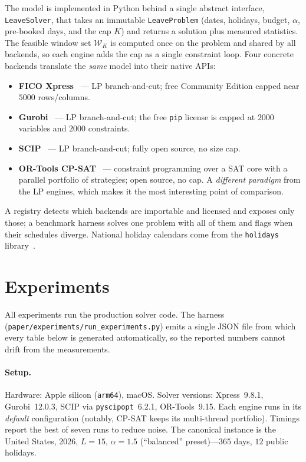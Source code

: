 \documentclass[10pt,twocolumn]{article}
\begin{document}
The model is implemented in Python behind a single abstract interface,
\texttt{LeaveSolver}, that takes an immutable \texttt{LeaveProblem} (dates,
holidays, budget, $\alpha$, pre-booked days, and the cap $K$) and returns a
solution plus measured statistics. The feasible window set $\mathcal{W}_K$ is
computed once on the problem and shared by all backends, so each engine adds the
cap as a single constraint loop. Four concrete backends translate the
\emph{same} model into their native APIs:
\begin{itemize}[leftmargin=1.4em,itemsep=2pt,topsep=2pt]
  \item \textbf{FICO Xpress}~\cite{ficoxpress} --- LP branch-and-cut; free
        Community Edition capped near $5000$ rows/columns.
  \item \textbf{Gurobi}~\cite{gurobi} --- LP branch-and-cut; the free
        \texttt{pip} license is capped at $2000$ variables and $2000$
        constraints.
  \item \textbf{SCIP}~\cite{bestuzheva2023scip} --- LP branch-and-cut; fully
        open source, no size cap.
  \item \textbf{OR-Tools CP-SAT}~\cite{perron2023cpsat} --- constraint
        programming over a SAT core with a parallel portfolio of strategies;
        open source, no cap. A \emph{different paradigm} from the LP engines,
        which makes it the most interesting point of comparison.
\end{itemize}
A registry detects which backends are importable and licensed and exposes only
those; a benchmark harness solves one problem with all of them and flags when
their schedules diverge. National holiday calendars come from the
\texttt{holidays} library~\cite{pythonholidays}.

\section{Experiments}
\label{sec:results}

All experiments run the production solver code. The harness
(\texttt{paper/experiments/run\_experiments.py}) emits a single JSON file from
which every table below is generated automatically, so the reported numbers
cannot drift from the measurements.

\paragraph{Setup.}
Hardware: Apple silicon (\texttt{arm64}), macOS. Solver versions: Xpress~9.8.1,
Gurobi~12.0.3, SCIP via \texttt{pyscipopt}~6.2.1, OR-Tools~9.15. Each engine
runs in its \emph{default} configuration (notably, CP-SAT keeps its multi-thread
portfolio). Timings report the best of seven runs to reduce noise. The
canonical instance is the United States, 2026, $L=15$, $\alpha=1.5$
(``balanced'' preset)---$365$ days, $12$ public holidays.
\end{document}
